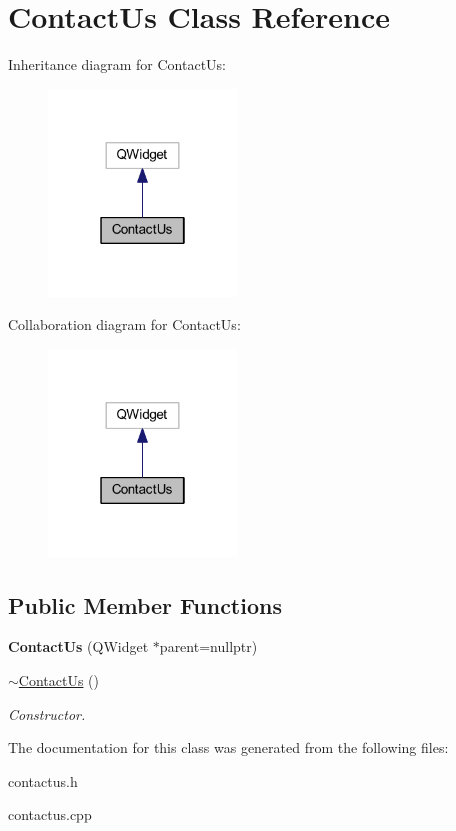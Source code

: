 \hypertarget{class_contact_us}{}\section{Contact\+Us Class Reference}
\label{class_contact_us}


Inheritance diagram for Contact\+Us\+:\nopagebreak
\begin{figure}[H]
\begin{center}
\leavevmode
\includegraphics[width=142pt]{class_contact_us__inherit__graph}
\end{center}
\end{figure}


Collaboration diagram for Contact\+Us\+:\nopagebreak
\begin{figure}[H]
\begin{center}
\leavevmode
\includegraphics[width=142pt]{class_contact_us__coll__graph}
\end{center}
\end{figure}
\subsection*{Public Member Functions}
\begin{DoxyCompactItemize}
\item 
\mbox{\label{class_contact_us_a6e20fc1c353d994a2f0bf13df4580232}} 
{\bfseries Contact\+Us} (Q\+Widget $\ast$parent=nullptr)
\item 
\mbox{\label{class_contact_us_a44bd80bbb4908c913bb07019a609c5ba}} 
\mbox{\hyperlink{class_contact_us_a44bd80bbb4908c913bb07019a609c5ba}{$\sim$\+Contact\+Us}} ()
\begin{DoxyCompactList}\small\item\em Constructor. \end{DoxyCompactList}\end{DoxyCompactItemize}


The documentation for this class was generated from the following files\+:\begin{DoxyCompactItemize}
\item 
contactus.\+h\item 
contactus.\+cpp\end{DoxyCompactItemize}

